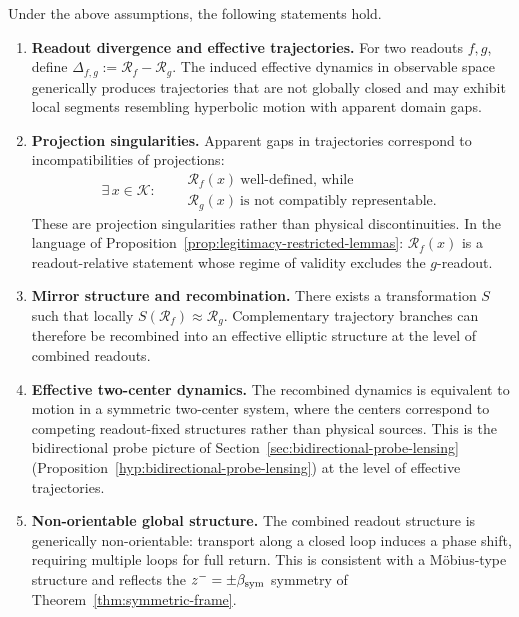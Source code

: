 \begin{theorem}
\label{thm:hc-readout-geometry}
Under the above assumptions, the following statements hold.
\begin{enumerate}[label=(\arabic*)]
  \item \textbf{Readout divergence and effective trajectories.}
  For two readouts $f,g$, define
  $\Delta_{f,g} := \mathcal{R}_f - \mathcal{R}_g$.
  The induced effective dynamics in observable space generically
  produces trajectories that are not globally closed and may exhibit
  local segments resembling hyperbolic motion with apparent domain gaps.

  \item \textbf{Projection singularities.}
  Apparent gaps in trajectories correspond to incompatibilities of
  projections:
  \[
    \exists\, x \in \mathcal{K}:\quad
    \begin{aligned}
      &\mathcal{R}_f(x)\ \text{well-defined, while}\\
      &\mathcal{R}_g(x)\ \text{is not compatibly representable.}
    \end{aligned}
  \]
  These are projection singularities rather than physical
  discontinuities. In the language of
  Proposition~\ref{prop:legitimacy-restricted-lemmas}: $\mathcal{R}_f(x)$
  is a readout-relative statement whose regime of validity excludes the
  $g$-readout.

  \item \textbf{Mirror structure and recombination.}
  There exists a transformation $S$ such that locally
  $S(\mathcal{R}_f) \approx \mathcal{R}_g$.
  Complementary trajectory branches can therefore be recombined into
  an effective elliptic structure at the level of combined readouts.

  \item \textbf{Effective two-center dynamics.}
  The recombined dynamics is equivalent to motion in a symmetric
  two-center system, where the centers correspond to competing
  readout-fixed structures rather than physical sources. This is
  the bidirectional probe picture of
  Section~\ref{sec:bidirectional-probe-lensing}
  (Proposition~\ref{hyp:bidirectional-probe-lensing}) at the level of
  effective trajectories.

  \item \textbf{Non-orientable global structure.}
  The combined readout structure is generically non-orientable:
  transport along a closed loop induces a phase shift, requiring
  multiple loops for full return. This is consistent with a
  Möbius-type structure and reflects the $z^- = \pm\beta_{\mathrm{sym}}$
  symmetry of Theorem~\ref{thm:symmetric-frame}.


\end{enumerate}
\end{theorem}
